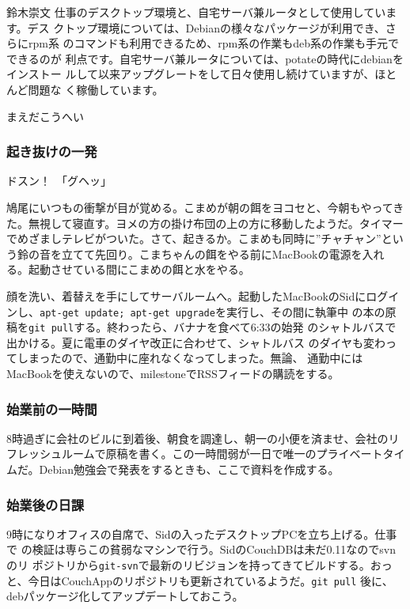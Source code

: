 \begin{prework}{ 鈴木崇文 }
 仕事のデスクトップ環境と、自宅サーバ兼ルータとして使用しています。デス
 クトップ環境については、Debianの様々なパッケージが利用でき、さらにrpm系
 のコマンドも利用できるため、rpm系の作業もdeb系の作業も手元でできるのが
 利点です。自宅サーバ兼ルータについては、potateの時代にdebianをインストー
 ルして以来アップグレートをして日々使用し続けていますが、ほとんど問題な
 く稼働しています。
\end{prework}

\begin{prework}{ まえだこうへい }

 \subsubsection{起き抜けの一発}
 ドスン！　「グヘッ」

 鳩尾にいつもの衝撃が目が覚める。こまめが朝の餌をヨコセと、今朝もやってき
 た。無視して寝直す。ヨメの方の掛け布団の上の方に移動したようだ。タイマーでめざましテレビがついた。さて、起きるか。こまめも同時に''チャチャン''という鈴の音を立てて先回り。こまちゃんの餌をやる前にMacBookの電源を入れる。起動させている間にこまめの餌と水をやる。

 顔を洗い、着替えを手にしてサーバルームへ。起動したMacBookのSidにログイ
 ンし、\texttt{apt-get update; apt-get upgrade}を実行し、その間に執筆中
 の本の原稿を\texttt{git pull}する。終わったら、バナナを食べて6:33の始発
 のシャトルバスで出かける。夏に電車のダイヤ改正に合わせて、シャトルバス
 のダイヤも変わってしまったので、通勤中に座れなくなってしまった。無論、
 通勤中にはMacBookを使えないので、milestoneでRSSフィードの購読をする。

\subsubsection{始業前の一時間}
8時過ぎに会社のビルに到着後、朝食を調達し、朝一の小便を済ませ、会社のリ
フレッシュルームで原稿を書く。この一時間弱が一日で唯一のプライベートタイ
ムだ。Debian勉強会で発表をするときも、ここで資料を作成する。

\subsubsection{始業後の日課}
9時になりオフィスの自席で、Sidの入ったデスクトップPCを立ち上げる。仕事で
の検証は専らこの貧弱なマシンで行う。SidのCouchDBは未だ0.11なのでsvnのリ
ポジトリから\texttt{git-svn}で最新のリビジョンを持ってきてビルドする。おっ
と、今日はCouchAppのリポジトリも更新されているようだ。\texttt{git pull}
後に、debパッケージ化してアップデートしておこう。


\end{prework}
